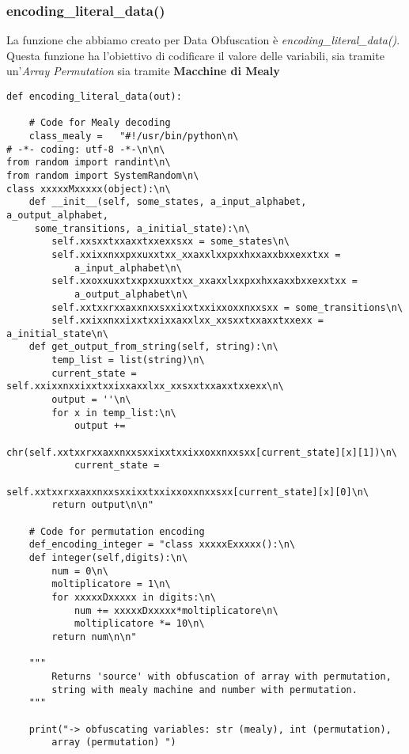 \documentclass[a4paper,oneside,openright,titlepage,10pt,footinclude,headinclude]{scrbook}
\begin{document}
\subsubsection{encoding\_literal\_data()}

La funzione che abbiamo creato per Data Obfuscation è \textit{encoding\_literal\_data()}. Questa funzione ha l'obiettivo di codificare il valore delle variabili, sia tramite un'\textit{Array Permutation} sia tramite \textbf{Macchine di Mealy}

\begin{graybox}[innerleftmargin=2,]
\begin{lstlisting}
def encoding_literal_data(out):

    # Code for Mealy decoding
    class_mealy =   "#!/usr/bin/python\n\
# -*- coding: utf-8 -*-\n\n\
from random import randint\n\
from random import SystemRandom\n\
class xxxxxMxxxxx(object):\n\
    def __init__(self, some_states, a_input_alphabet, a_output_alphabet,
     some_transitions, a_initial_state):\n\
        self.xxsxxtxxaxxtxxexxsxx = some_states\n\
        self.xxixxnxxpxxuxxtxx_xxaxxlxxpxxhxxaxxbxxexxtxx = 
            a_input_alphabet\n\
        self.xxoxxuxxtxxpxxuxxtxx_xxaxxlxxpxxhxxaxxbxxexxtxx = 
            a_output_alphabet\n\
        self.xxtxxrxxaxxnxxsxxixxtxxixxoxxnxxsxx = some_transitions\n\
        self.xxixxnxxixxtxxixxaxxlxx_xxsxxtxxaxxtxxexx = a_initial_state\n\
    def get_output_from_string(self, string):\n\
        temp_list = list(string)\n\
        current_state = self.xxixxnxxixxtxxixxaxxlxx_xxsxxtxxaxxtxxexx\n\
        output = ''\n\
        for x in temp_list:\n\
            output += 
                chr(self.xxtxxrxxaxxnxxsxxixxtxxixxoxxnxxsxx[current_state][x][1])\n\
            current_state = 
                self.xxtxxrxxaxxnxxsxxixxtxxixxoxxnxxsxx[current_state][x][0]\n\
        return output\n\n"

    # Code for permutation encoding
    def_encoding_integer = "class xxxxxExxxxx():\n\
    def integer(self,digits):\n\
        num = 0\n\
        moltiplicatore = 1\n\
        for xxxxxDxxxxx in digits:\n\
            num += xxxxxDxxxxx*moltiplicatore\n\
            moltiplicatore *= 10\n\
        return num\n\n"

    """
        Returns 'source' with obfuscation of array with permutation, 
        string with mealy machine and number with permutation.
    """

    print("-> obfuscating variables: str (mealy), int (permutation), 
        array (permutation) ")


\end{lstlisting}
\end{graybox}
\end{document}
